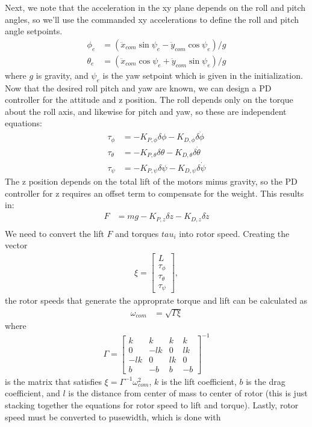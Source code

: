 \documentclass[10pt]{article}
\newcommand{\bmat}[1]{\begin{bmatrix} #1 \end{bmatrix}} %
\begin{document}
	Next, we note that the acceleration in the xy plane depends on the roll and pitch angles, so we'll use the commanded xy accelerations to define the roll and pitch angle setpoints. 
	\begin{align*}
		\phi_e &= (\ddot{x}_{com} \sin \psi_e - \ddot{y}_{com} \cos \psi_e)/g \\	
		\theta_e &= (\ddot{x}_{com} \cos \psi_e + \ddot{y}_{com} \sin \psi_e)/g		
	\end{align*}
	where $g$ is gravity, and $\psi_e$ is the yaw setpoint which is given in the initialization. Now that the desired roll pitch and yaw are known, we can design a PD controller for the attitude and z position. The roll depends only on the torque about the roll axis, and likewise for pitch and yaw, so these are independent equations:
	\begin{align*}
		\tau_\phi &= -K_{P,\phi} \delta \phi - K_{D,\phi}\delta \dot{\phi} \\
		\tau_\theta &= -K_{P,\theta} \delta \theta - K_{D,\theta}\delta \dot{\theta} \\
		\tau_\psi &= -K_{P,\psi} \delta \psi - K_{D,\psi}\delta \dot{\psi}
	\end{align*}
	The z position depends on the total lift of the motors minus gravity, so the PD controller for z requires an offset term to compensate for the weight. This results in:
	\begin{align*}
		F &= mg - K_{P,z}\delta z - K_{D,z}\delta \dot{z} \\
	\end{align*}
	We need to convert the lift $F$ and torques $tau_i$ into rotor speed. Creating the vector 
	\begin{align*}
		\xi  = \bmat{L \\ \tau_\phi \\ \tau_\theta \\ \tau_\psi},
	\end{align*}
	the rotor speeds that generate the approprate torque and lift can be calculated as 
	\begin{align*}
		\omega_{com} &= \sqrt{\Gamma \xi}
	\end{align*}
	where 
	\begin{align*}
		\Gamma = \bmat{k & k& k & k \\ 0 & -lk & 0 & lk \\ -lk & 0 & lk & 0 \\ b & -b & b & -b}^{-1}
	\end{align*}
	is the matrix that satisfies $\xi = \Gamma^{-1}\omega_{com}^2$, $k$ is the lift coefficient, $b$ is the drag coefficient, and $l$ is the distance from center of mass to center of rotor (this is just stacking together the equations for rotor speed to lift and torque). Lastly, rotor speed must be converted to pusewidth, which is done with 
\end{document}
